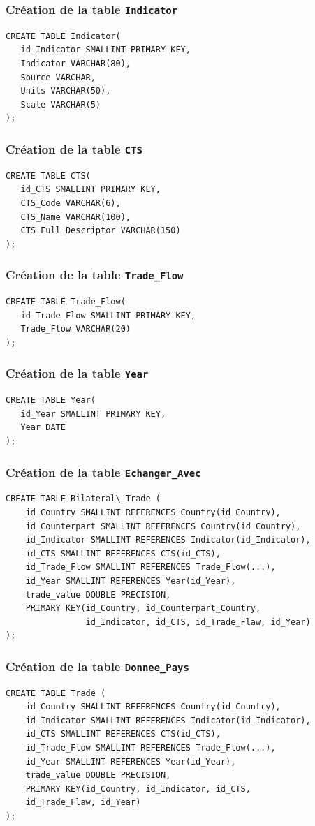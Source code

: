 \documentclass[11pt]{beamer}
\begin{document}
\begin{frame}[fragile]
  \frametitle{Création de la table \texttt{Indicator}}
\begin{verbatim}
CREATE TABLE Indicator(
   id_Indicator SMALLINT PRIMARY KEY,
   Indicator VARCHAR(80),
   Source VARCHAR,
   Units VARCHAR(50),
   Scale VARCHAR(5)
);
\end{verbatim}
\end{frame}

\begin{frame}[fragile]
  \frametitle{Création de la table \texttt{CTS}}
\begin{verbatim}
CREATE TABLE CTS(
   id_CTS SMALLINT PRIMARY KEY,
   CTS_Code VARCHAR(6),
   CTS_Name VARCHAR(100),
   CTS_Full_Descriptor VARCHAR(150)
);
\end{verbatim}
\end{frame}

\begin{frame}[fragile]
  \frametitle{Création de la table \texttt{Trade\_Flow}}
\begin{verbatim}
CREATE TABLE Trade_Flow(
   id_Trade_Flow SMALLINT PRIMARY KEY,
   Trade_Flow VARCHAR(20)
);
\end{verbatim}
\end{frame}

\begin{frame}[fragile]
  \frametitle{Création de la table \texttt{Year}}
\begin{verbatim}
CREATE TABLE Year(
   id_Year SMALLINT PRIMARY KEY,
   Year DATE
);
\end{verbatim}
\end{frame}

\begin{frame}[fragile]
  \frametitle{Création de la table \texttt{Echanger\_Avec}}
\begin{verbatim}
CREATE TABLE Bilateral\_Trade (
    id_Country SMALLINT REFERENCES Country(id_Country),
    id_Counterpart SMALLINT REFERENCES Country(id_Country),
    id_Indicator SMALLINT REFERENCES Indicator(id_Indicator),
    id_CTS SMALLINT REFERENCES CTS(id_CTS),
    id_Trade_Flow SMALLINT REFERENCES Trade_Flow(...),
    id_Year SMALLINT REFERENCES Year(id_Year),
    trade_value DOUBLE PRECISION,
    PRIMARY KEY(id_Country, id_Counterpart_Country,
                id_Indicator, id_CTS, id_Trade_Flaw, id_Year)
);
\end{verbatim}
\end{frame}

\begin{frame}[fragile]
  \frametitle{Création de la table \texttt{Donnee\_Pays}}
\begin{verbatim}
CREATE TABLE Trade (
    id_Country SMALLINT REFERENCES Country(id_Country),
    id_Indicator SMALLINT REFERENCES Indicator(id_Indicator),
    id_CTS SMALLINT REFERENCES CTS(id_CTS),
    id_Trade_Flow SMALLINT REFERENCES Trade_Flow(...),
    id_Year SMALLINT REFERENCES Year(id_Year),
    trade_value DOUBLE PRECISION,
    PRIMARY KEY(id_Country, id_Indicator, id_CTS, 
    id_Trade_Flaw, id_Year)
);
\end{verbatim}
\end{frame}
\end{document}
